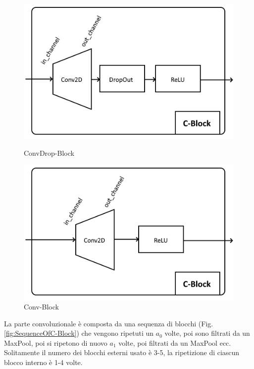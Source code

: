 \documentclass[target=mst]{thud}
\begin{document}
\begin{figure}[h!]
    \centering
    \begin{minipage}[b]{0.4\textwidth}
      \centering
      \includegraphics[scale=0.455]{ConvDrop-Block.png}
      \caption{ConvDrop-Block}
      \label{fig:ConvDrop-Block}
    \end{minipage}
    \begin{minipage}[b]{0.4\textwidth}
      \centering
      \includegraphics[scale=0.455]{Conv-Block.png}
      \caption{Conv-Block}
      \label{fig:Conv-Block}
    \end{minipage}
\end{figure}

\noindent
La parte convoluzionale è composta da una sequenza di blocchi (Fig. \ref{fig:SequenceOfC-Block}) che vengono ripetuti un $a_0$ volte, poi sono filtrati da un MaxPool, poi si ripetono di nuovo $a_1$ volte, poi filtrati da un MaxPool ecc.
Solitamente il numero dei blocchi esterni usato è 3-5, la ripetizione di ciascun blocco interno è 1-4 volte.
\end{document}
